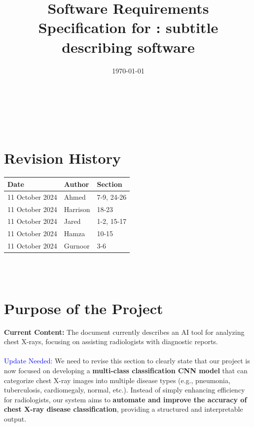 \documentclass[12pt]{article}
\begin{document}
\title{Software Requirements Specification for \progname: subtitle describing software} 
\author{\authname}
\date{\today}
	
\maketitle
{}

~\newpage

\tableofcontents

~\newpage

\section*{Revision History}

\begin{tabularx}{\textwidth}{p{3cm}p{2cm}X}
\toprule {\textbf{Date}} & {Author} & {Section}\\
\midrule
11 October 2024 & Ahmed & 7-9, 24-26 \\
11 October 2024 & Harrison & 18-23 \\
11 October 2024 & Jared & 1-2, 15-17 \\
11 October 2024 & Hamza & 10-15 \\
11 October 2024 & Gurnoor & 3-6 \\
\bottomrule
\end{tabularx}

~\\

~\newpage
\section{Purpose of the Project}

\textbf{Current Content:} The document currently describes an AI tool for analyzing chest X-rays, focusing on assisting radiologists with diagnostic reports.  \\
\\
{\textcolor{blue}{Update Needed:}} We need to revise this section to clearly state that our project is now focused on developing a \textbf{multi-class classification CNN model} that can categorize chest X-ray images into multiple disease types (e.g., pneumonia, tuberculosis, cardiomegaly, normal, etc.). Instead of simply enhancing efficiency for radiologists, our system aims to \textbf{automate and improve the accuracy of chest X-ray disease classification}, providing a structured and interpretable output.\\
\end{document}
